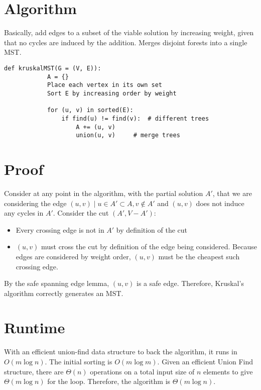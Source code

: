 \documentclass[11pt]{article}
\begin{document}
\section{Algorithm}
	Basically, add edges to a subset of the viable solution by increasing weight, given that no cycles are induced by the addition. Merges disjoint forests into a single MST.
	
	\begin{lstlisting}[autogobble=true]
		def kruskalMST(G = (V, E)):
			A = {}
			Place each vertex in its own set
			Sort E by increasing order by weight
			
			for (u, v) in sorted(E):
				if find(u) != find(v):	# different trees
					A += (u, v)
					union(u, v)		# merge trees
	\end{lstlisting}

\section{Proof}
	Consider at any point in the algorithm, with the partial solution $A'$, that we are considering the edge $(u, v) \mid u \in A' \subset A, v \notin A'$ and $(u, v)$ does not induce any cycles in $A'$. Consider the cut $(A', V - A')$:
	\begin{itemize}
		\item Every crossing edge is not in $A'$ by definition of the cut
		\item $(u, v)$ must cross the cut by definition of the edge being considered. Because edges are considered by weight order, $(u, v)$ must be the cheapest such crossing edge.
	\end{itemize}
	By the safe spanning edge lemma, $(u, v)$ is a safe edge. Therefore, Kruskal's algorithm correctly generates an MST.
	
\section{Runtime}
	With an efficient union-find data structure to back the algorithm, it runs in $O(m\log n)$. The initial sorting is $O(m \log m)$. Given an efficient Union Find structure, there are $\Theta(n)$ operations on a total input size of $n$ elements to give $\Theta(m \log n)$ for the loop. Therefore, the algorithm is $\Theta(m \log n)$.

%		
%		


\end{document}
